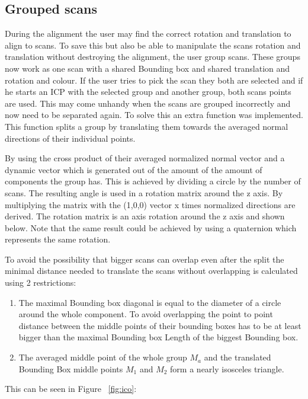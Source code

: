 \documentclass[hyperref,english,bachelorofscience,bibnum,twoside]{cgvpub}
\begin{document}
\subsection{Grouped scans}

During the alignment the user may find the correct rotation and translation to align to scans. To save this but also be able to manipulate the scans rotation and translation without destroying the alignment, the user group scans. These groups now work as one scan with a shared Bounding box and shared translation and rotation and colour. If the user tries to pick the scan they both are selected and if he starts an ICP with the selected group and another group, both scans points are used.
This may come unhandy when the scans are grouped incorrectly and now need to be separated again. To solve this an extra function was implemented. This function splits a group by translating them towards the averaged normal directions of their individual points.

By using the cross product of their averaged normalized normal vector and a dynamic vector which is generated out of the amount of the amount of components the group has.
This is achieved by dividing a circle by the number of scans. The resulting angle is used in a rotation matrix around the z axis. By multiplying the matrix with the (1,0,0) vector x times normalized directions are derived.
The rotation matrix is an axis rotation around the z axis and shown below. Note that the same result could be achieved by using a quaternion which represents the same rotation.


To avoid the possibility that bigger scans can overlap even after the split the minimal distance needed to translate the scans without overlapping is calculated using 2 restrictions:
\begin{enumerate}
\item The maximal Bounding box diagonal is equal to the diameter of a circle around the whole component. To avoid overlapping the point to point distance between the middle points of their bounding boxes has to be at least bigger than the maximal Bounding box Length of the biggest Bounding box.
\item The averaged middle point of the whole group $M_a$ and the translated Bounding Box middle points $M_1$ and $M_2$ form a nearly isosceles triangle.
\end{enumerate}
This can be seen in Figure ~\ref{fig:ico}: 
\end{document}
